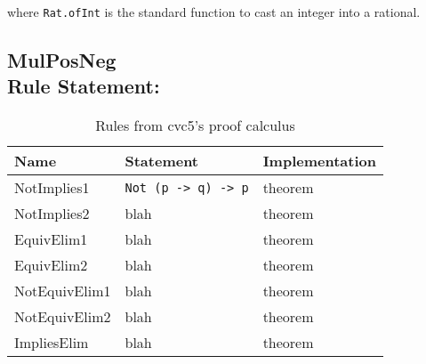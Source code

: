 where \texttt{Rat.ofInt} is the standard function to cast an integer into a rational.

\subsection{MulPosNeg\\Rule Statement:}



\begin{table}[]\label{tab:rules}
\centering
\begin{tabular}{ l l l }
\toprule
Name        & Statement & Implementation \\ \midrule
NotImplies1 & \texttt{Not (p -> q) -> p}      & theorem        \\ \midrule
NotImplies2 & blah      & theorem        \\ \midrule
EquivElim1  & blah      & theorem        \\ \midrule
EquivElim2  & blah      & theorem        \\ \midrule
NotEquivElim1  & blah      & theorem        \\ \midrule
NotEquivElim2  & blah      & theorem        \\ \midrule
ImpliesElim & blah      & theorem        \\ \bottomrule
\end{tabular}
\caption{Rules from cvc5's proof calculus}
\end{table}




